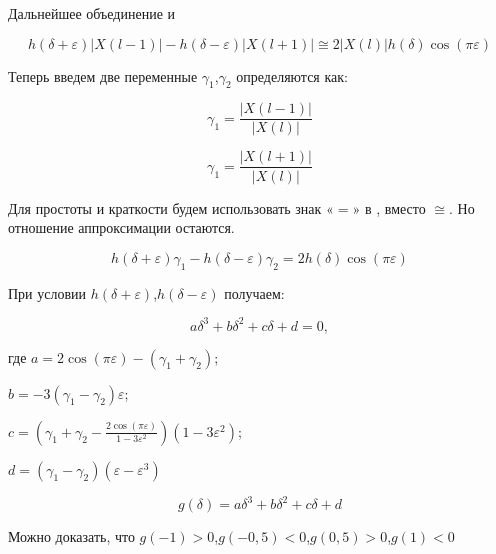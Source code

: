 Дальнейшее объединение  и 

\begin{equation}
	\label{eq:equation30}
	h(\delta+\varepsilon)\left|{X(l-1)} \right| - h(\delta - \varepsilon) \left|{X(l+1)} \right| \cong 2 \left|{X(l)} \right| h(\delta) \cos{(\pi \varepsilon)}
\end{equation}

Теперь введем две переменные $\gamma_1$,$\gamma_2$ определяются как:

\begin{equation}
	\label{eq:equation31}
	\gamma_1 = \frac{\left| X(l-1)\right|}{\left| X(l)\right|}
\end{equation}

\begin{equation}
	\label{eq:equation32}
	\gamma_1 = \frac{\left| X(l+1)\right|}{\left| X(l)\right|}
\end{equation}

Для простоты и краткости будем использовать знак $«=»$ в , вместо $\cong$. Но отношение аппроксимации остаются. 

\begin{equation}
	\label{eq:equation33}
	h(\delta +\varepsilon)\gamma_1 - h(\delta -\varepsilon)\gamma_2 = 
	2h(\delta) \cos(\pi \varepsilon) 
\end{equation}

При условии $h(\delta +\varepsilon)$,$h(\delta -\varepsilon)$ получаем:

\begin{equation}
	\label{eq:equation34}
	{a \delta}^3 + {b \delta}^2 + c \delta + d = 0, 
\end{equation}

где $a = 2 \cos(\pi \varepsilon)-(\gamma_1 + \gamma_2)$;

$b = -3(\gamma_1 - \gamma_2)\varepsilon$;

$c = \left( \gamma_1 + \gamma_2 - \frac{2 \cos(\pi \varepsilon)}{1-3\varepsilon^2}
\right) \left( {1-3\varepsilon^2} \right) $;

$d = ( \gamma_1 - \gamma_2)(\varepsilon - \varepsilon^3)$

\begin{equation}
	\label{eq:equation35}
	g(\delta) = {a \delta}^3 + {b \delta}^2 + c \delta + d
\end{equation}

Можно доказать, что $g(-1)>0$,$g(-0,5)<0$,$g(0,5)>0$,$g(1)<0$ 

